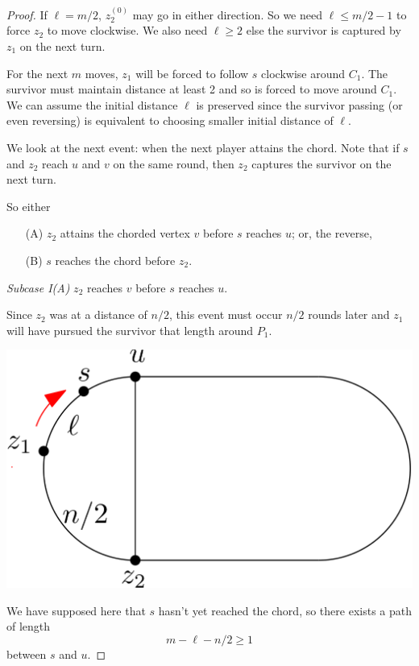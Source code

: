 \documentclass[letterpaper, 10pt]{article}
\begin{document}
\begin{proof}
If $\ell = m/2$, $z_2^{(0)}$ may go in either direction.
So we need $\ell \leq m/2 -1$ to force $z_2$ to move clockwise. We also need $\ell \geq 2$ else the survivor is captured by $z_1$
on the next turn.

For the next $m$ moves, $z_1$ will be forced to follow $s$ clockwise around $C_1$.
The survivor must maintain distance at least 2 and so is forced to move around $C_1$. We can assume
the initial distance $\ell$ is preserved since the survivor passing (or even reversing)
is equivalent to choosing smaller initial distance of $\ell$.

We look at the next event: when the next player attains the chord.
Note that if $s$ and $z_2$ reach $u$ and $v$ on the same round, then $z_2$ captures
the survivor on the next turn.

So either
\begin{enumerate}
\item[(A)] $z_2$ attains the chorded vertex $v$ before $s$ reaches $u$; or, the reverse,
\item[(B)] $s$ reaches the chord before $z_2$.
\end{enumerate}

\emph{Subcase I(A)} $z_2$ reaches $v$ before $s$ reaches $u$.

Since $z_2$ was at a distance of $n/2$, this event must occur $n/2$ rounds later and $z_1$ will
have pursued the survivor that length around $P_1$.

\begin{center}
\includegraphics[scale=0.15]{diagramCaseIA_1}
\end{center}

We have supposed here that $s$ hasn't yet reached the chord, so there exists a path of length
\[m - \ell -n/2 \geq 1 \]
between $s$ and $u$.


\end{proof}
\end{document}
